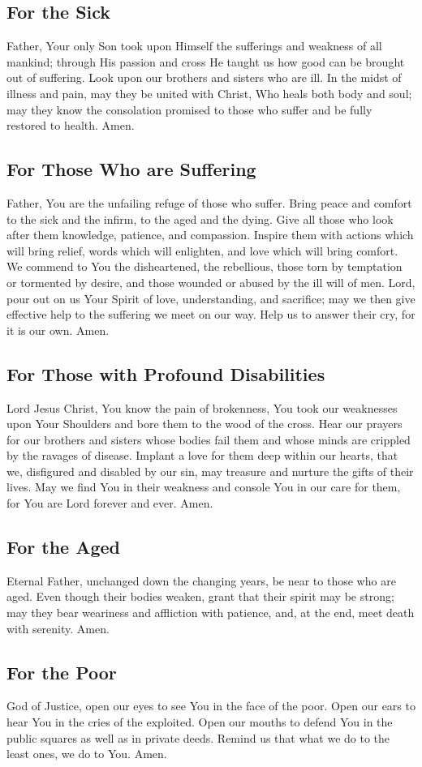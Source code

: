 \documentclass[12pt]{article}
\newcommand{\prayertitle}[1]{\subsection{#1}}
\begin{document}
\prayertitle{For the Sick}
Father, Your only Son took upon Himself the sufferings and weakness of all mankind; through His passion and cross He taught us how good can be brought out of suffering.
Look upon our brothers and sisters who are ill.
In the midst of illness and pain, may they be united with Christ, Who heals both body and soul; may they know the consolation promised to those who suffer and be fully restored to health.
Amen.

\prayertitle{For Those Who are Suffering}
Father, You are the unfailing refuge of those who suffer.
Bring peace and comfort to the sick and the infirm, to the aged and the dying.
Give all those who look after them knowledge, patience, and compassion.
Inspire them with actions which will bring relief, words which will enlighten, and love which will bring comfort.
We commend to You the disheartened, the rebellious, those torn by temptation or tormented by desire, and those wounded or abused by the ill will of men.
Lord, pour out on us Your Spirit of love, understanding, and sacrifice; may we then give effective help to the suffering we meet on our way.
Help us to answer their cry, for it is our own.
Amen.

\prayertitle{For Those with Profound Disabilities}
\label{prayer:profound_disabilities}
Lord Jesus Christ, 
You know the pain of brokenness, You took our weaknesses upon Your Shoulders and bore them to the wood of the cross.
Hear our prayers for our brothers and sisters whose bodies fail them and whose minds are crippled by the ravages of disease.
Implant a love for them deep within our hearts, that we, disfigured and disabled by our sin, may treasure and nurture the gifts of their lives.
May we find You in their weakness and console You in our care for them, for You are Lord forever and ever.
Amen.

\prayertitle{For the Aged}
Eternal Father, unchanged down the changing years, be near to those who are aged.
Even though their bodies weaken, grant that their spirit may be strong; may they bear weariness and affliction with patience, and, at the end, meet death with serenity.
Amen.

\prayertitle{For the Poor}
\label{prayer:poor}
God of Justice, open our eyes to see You in the face of the poor.
Open our ears to hear You in the cries of the exploited.
Open our mouths to defend You in the public squares as well as in private deeds.
Remind us that what we do to the least ones, we do to You.
Amen.
\end{document}

